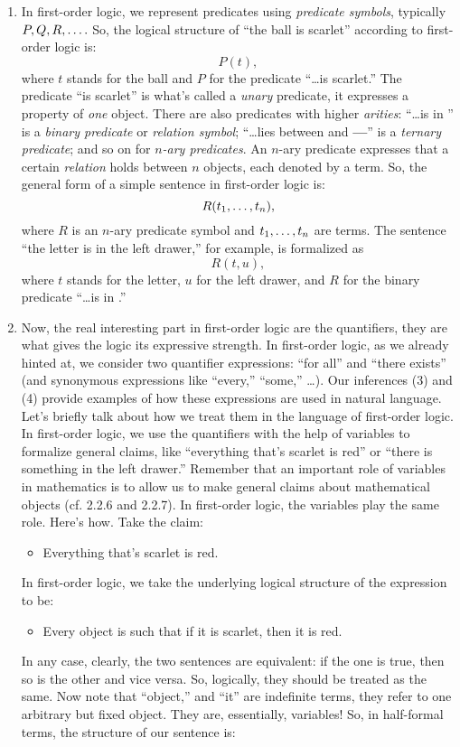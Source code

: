 \begin{enumerate}[\thesection.1]
		\item In first-order logic, we represent predicates using \emph{predicate symbols}, typically $P,Q,R, \mathellipsis.$ So, the logical structure of ``the ball is scarlet'' according to first-order logic is: \[P(t),\] where $t$ stands for the ball and $P$ for the predicate ``\dots is scarlet.'' The predicate ``is scarlet'' is what's called a \emph{unary} predicate, it expresses a property of \emph{one} object. There are also predicates with higher \emph{arities}: ``\dots is in \underline{\phantom{\dots}}'' is a \emph{binary predicate} or \emph{relation symbol}; ``\dots lies between \underline{\phantom{\dots}} and \textbf{---}'' is a \emph{ternary predicate}; and so on for \emph{$n$-ary predicates}. An $n$-ary predicate expresses that a certain \emph{relation} holds between $n$ objects, each denoted by a term. So, the general form of a simple sentence in first-order logic is: \[R(t_1, \mathellipsis, t_n),\] where $R$ is an $n$-ary predicate symbol and $t_1,\mathellipsis, t_n$ are terms. The sentence ``the letter is in the left drawer,'' for example, is formalized as \[R(t, u),\] where $t$ stands for the letter, $u$ for the left drawer, and $R$ for the binary predicate ``\dots is in \underline{\phantom{\dots}}.''
		
		\item Now, the real interesting part in first-order logic are the quantifiers, they are what gives the logic its expressive strength. In first-order logic, as we already hinted at, we consider two quantifier expressions: ``for all'' and ``there exists'' (and synonymous expressions like ``every,'' ``some,'' \dots). Our inferences (3) and (4) provide examples of how these expressions are used in natural language. Let's briefly talk about how we treat them in the language of first-order logic. In first-order logic, we use the quantifiers with the help of variables to formalize general claims, like ``everything that's scarlet is red'' or ``there is something in the left drawer.'' Remember that an important role of variables in mathematics is to allow us to make general claims about mathematical objects (cf. 2.2.6 and 2.2.7). In first-order logic, the variables play the same role. Here's how. Take the claim:
		\begin{itemize}
		\item Everything that's scarlet is red.
		\end{itemize}
In first-order logic, we take the underlying logical structure of the expression to be:
	\begin{itemize}
		\item Every object is such that if it is scarlet, then it is red.
	\end{itemize} 
		In any case, clearly, the two sentences are equivalent: if the one is true, then so is the other and vice versa.
		So, logically, they should be treated as the same.
		Now note that ``object,'' and ``it'' are indefinite terms, they refer to one arbitrary but fixed object.
		They are, essentially, variables! So, in half-formal terms, the structure of our sentence is:
	\begin{itemize}
	

\end{itemize}
\end{enumerate}
